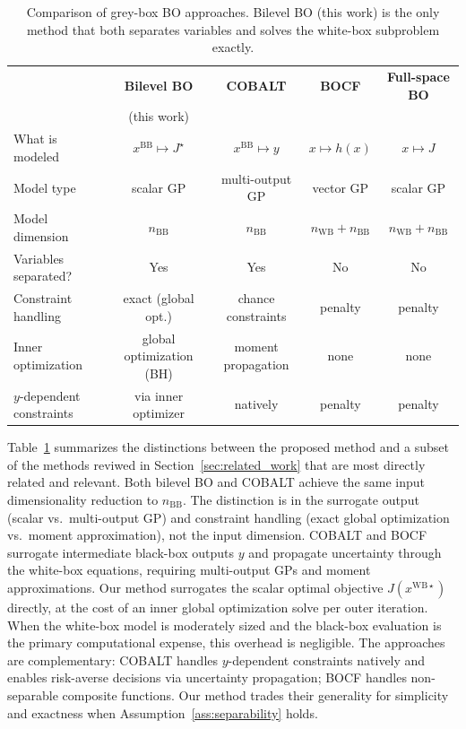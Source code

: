 \documentclass[12pt,a4paper]{article}%
\theoremstyle{plain}%
\theoremstyle{remark}%
\theoremstyle{definition}%
\def\WB{\mathrm{WB}}
\def\BB{\mathrm{BB}}
\begin{document}
\begin{table}[htbp]
\centering
\caption{Comparison of grey-box BO approaches. Bilevel BO (this work) is the only method that both separates variables and solves the white-box subproblem exactly.}
\label{tab:method_comparison}
\begin{tabular}{@{}lcccc@{}}
\toprule
& \textbf{Bilevel BO} & \textbf{COBALT} & \textbf{BOCF} & \textbf{Full-space BO} \\
& (this work) & \cite{paulson2022cobalt} & \cite{astudillo2019bocf} & \\
\midrule
What is modeled & $x^{\BB} \mapsto J^\star$ & $x^{\BB} \mapsto y$ & $x \mapsto h(x)$ & $x \mapsto J$ \\
Model type & scalar GP & multi-output GP & vector GP & scalar GP \\
Model dimension & $n_{\BB}$ & $n_{\BB}$ & $n_{\WB}+n_{\BB}$ & $n_{\WB}+n_{\BB}$ \\
Variables separated? & Yes & Yes & No & No \\
Constraint handling & exact (global opt.) & chance constraints & penalty & penalty \\
Inner optimization & global optimization (BH) & moment propagation & none & none \\
$y$-dependent constraints & via inner optimizer & natively & penalty & penalty \\
\bottomrule
\end{tabular}
\end{table}

Table~\ref{tab:method_comparison} summarizes the distinctions between the proposed method and a subset of the methods reviwed in Section~\ref{sec:related_work} that are most directly related and relevant. Both bilevel BO and COBALT achieve the same input dimensionality reduction to $n_{\BB}$. The distinction is in the surrogate output (scalar vs.\ multi-output GP) and constraint handling (exact global optimization vs.\ moment approximation), not the input dimension. COBALT and BOCF surrogate intermediate black-box outputs $y$ and propagate uncertainty through the white-box equations, requiring multi-output GPs and moment approximations. Our method surrogates the scalar optimal objective $J(x^{\WB\star})$ directly, at the cost of an inner global optimization solve per outer iteration. When the white-box model is moderately sized and the black-box evaluation is the primary computational expense, this overhead is negligible. The approaches are complementary: COBALT handles $y$-dependent constraints natively and enables risk-averse decisions via uncertainty propagation; BOCF handles non-separable composite functions. Our method trades their generality for simplicity and exactness when Assumption~\ref{ass:separability} holds.
\end{document}
